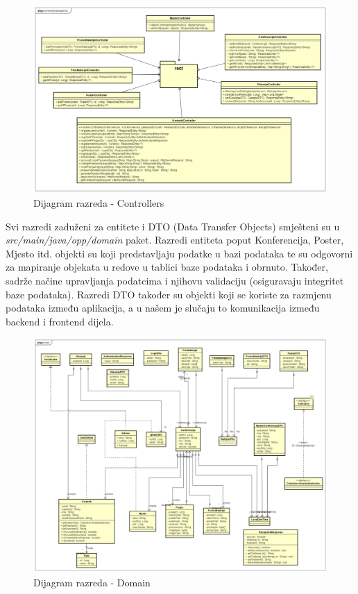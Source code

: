 		\begin{figure}[H]
			\includegraphics[width=\textwidth]{slike/controllersClassDiagram.PNG} %
			\caption{Dijagram razreda - Controllers}
			\label{fig:dr-controllers} %
		\end{figure}
		\newpage
		Svi razredi zaduženi za entitete i DTO (Data Transfer Objects) smješteni su u \textit{src/main/java/opp/domain} paket. Razredi entiteta poput Konferencija, Poster, Mjesto itd. objekti su koji predstavljaju podatke u bazi podataka te su odgovorni za mapiranje objekata u redove u tablici baze podataka i obrnuto. Također, sadrže načine upravljanja podatcima i njihovu validaciju (osiguravaju integritet baze podataka). Razredi DTO također su objekti koji se koriste za razmjenu podataka između aplikacija, a u našem je slučaju to komunikacija između backend i frontend dijela.
		\begin{figure}[H]
			\includegraphics[width=\textwidth]{slike/domainClassDiagram.PNG} %
			\caption{Dijagram razreda - Domain}
			\label{fig:dr-domain} %
		\end{figure}
